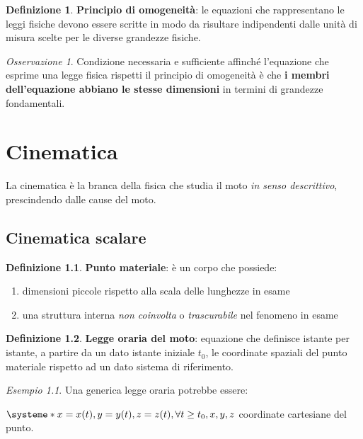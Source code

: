 \documentclass[a4paper, 12pt]{report}
\theoremstyle{definition}
\newtheorem{definition}{Definizione}[section]
\theoremstyle{remark}
\newtheorem*{example}{Esempio}
\newtheorem*{remark}{Osservazione}
\theoremstyle{plain}
\begin{document}
\begin{definition}
    {\bf Principio di omogeneità}: le equazioni che rappresentano le leggi fisiche devono essere scritte in modo da risultare indipendenti dalle unità di misura scelte per le diverse grandezze fisiche.
\end{definition}

\begin{remark}
    Condizione necessaria e sufficiente affinché l'equazione che esprime una legge fisica rispetti il principio di omogeneità è che {\bf i membri dell'equazione abbiano le stesse dimensioni} in termini di grandezze fondamentali.
\end{remark}

\chapter{Cinematica}

La cinematica è la branca della fisica che studia il moto {\it in senso descrittivo}, prescindendo dalle cause del moto.

\section{Cinematica scalare}

\begin{definition}
    {\bf Punto materiale}: è un corpo che possiede:
    \begin{enumerate}
        \item dimensioni piccole rispetto alla scala delle lunghezze in esame
        \item una struttura interna {\it non coinvolta} o {\it trascurabile} nel fenomeno in esame
    \end{enumerate}
\end{definition}

\begin{definition}
    {\bf Legge oraria del moto}: equazione che definisce istante per istante, a partire da un dato istante iniziale $t_0$, le coordinate spaziali del punto materiale rispetto ad un dato sistema di riferimento.
\end{definition}

\begin{example}
    Una generica legge oraria potrebbe essere:
    \begin{center}
        $\systeme*{x = x(t), y = y(t), z = z(t)}, \forall t \geq t_0, x, y, z$ coordinate cartesiane del punto.
    \end{center}
\end{example}
\end{document}
